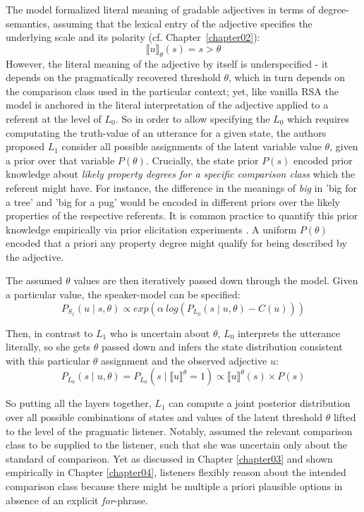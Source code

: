 The model formalized literal meaning of gradable adjectives in terms of degree-semantics, assuming that the lexical entry of the adjective specifies the underlying scale and its polarity (cf. Chapter~\ref{chapter02}):
$$\llbracket u \rrbracket_{\theta} (s) = s > \theta$$
However, the literal meaning of the adjective by itself is underspecified - it depends on the pragmatically recovered threshold $\theta$, which in turn depends on the comparison class used in the particular context; yet, like vanilla RSA the model is anchored in the literal interpretation of the adjective applied to a referent at the level of $L_0$.  
So in order to allow specifying the $L_0$ which requires computating the truth-value of an utterance for a given state, the authors proposed $L_1$ consider all possible assignments of the latent variable value $\theta$, given a prior over that variable $P(\theta)$. Crucially, the state prior $P(s)$ encoded prior knowledge about \emph{likely property degrees for a specific comparison class} which the referent might have. For instance, the difference in the meanings of \emph{big} in 'big for a tree' and 'big for a pug' would be encoded in different priors over the likely properties of the respective referents. It is common practice to quantify this prior knowledge empirically via prior elicitation experiments \parencite{problang}. A uniform $P(\theta)$ encoded that a priori any property degree might qualify for being described by the adjective. 

The assumed $\theta$ values are then iteratively passed down through the model. Given a particular value, the speaker-model can be specified:
$$P_{S_1} (u \mid s, \theta) \propto exp(\alpha \: log (P_{L_0} (s \mid u, \theta) - C(u)) )$$

Then, in contrast to $L_1$ who is uncertain about $\theta$, $L_0$ interprets the utterance literally, so she gets $\theta$ passed down and infers the state distribution consistent with this particular $\theta$ assignment and the observed adjective $u$:
$$P_{L_0} (s \mid u, \theta) = P_{L_0} (s \mid \llbracket u \rrbracket ^\theta = 1 ) \propto \llbracket u \rrbracket ^\theta (s) \times P(s)$$

So putting all the layers together, $L_1$ can compute a joint posterior distribution over all possible combinations of states and values of the latent threshold $\theta$ lifted to the level of the pragmatic listener. Notably, \textcite{lassiter2013context} assumed the relevant comparison class to be supplied to the listener, such that she was uncertain only about the standard of comparison. Yet as discussed in Chapter \ref{chapter03} and shown empirically in Chapter \ref{chapter04}, listeners flexibly reason about the intended comparison class because there might be multiple a priori plausible options in absence of an explicit \emph{for}-phrase.

